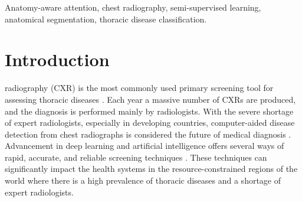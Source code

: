 \documentclass[journal]{IEEEtran}
\begin{document}
\begin{IEEEkeywords}
Anatomy-aware attention, chest radiography, semi-supervised learning, anatomical segmentation, thoracic disease classification.
\end{IEEEkeywords}

\section{Introduction}
 radiography (CXR) is the most commonly used primary screening tool for assessing thoracic diseases \cite{raoof2012interpretation}. Each year a massive number of CXRs are produced, and the diagnosis is performed mainly by radiologists. With the severe shortage of expert radiologists, especially in developing countries, computer-aided disease detection from chest radiographs is considered the future of medical diagnosis \cite{yu2011automatic, jaeger2013automatic}. Advancement in deep learning and artificial intelligence offers several ways of rapid, accurate, and reliable screening techniques \cite{litjens2017survey}. These techniques can significantly impact the health systems in the resource-constrained regions of the world where there is a high prevalence of thoracic diseases and a shortage of expert radiologists. \par
\end{document}
